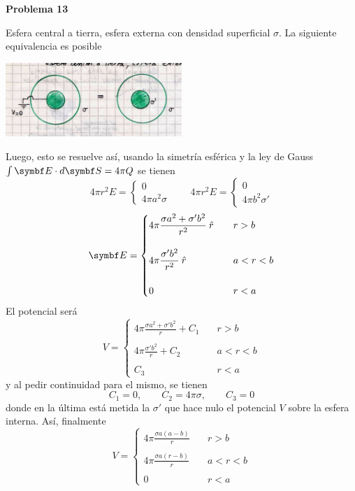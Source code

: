 \documentclass[10pt,oneside]{CBFT_book}
\begin{document}
\begin{ejemplo}{\bf Problema 13}

Esfera central a tierra, esfera externa con densidad superficial $\sigma$.
La siguiente equivalencia es posible

\includegraphics[width=0.5\textwidth]{images/fig_ft1_problema_13a.jpg}

Luego, esto se resuelve así, usando la simetría esférica y la ley de Gauss $ \int \vb{E}\cdot d\vb{S} = 4 \pi Q$
se tienen
\[
	4 \pi r^2 E = \begin{cases} 
	               0 \\
	               4 \pi a^2 \sigma
	              \end{cases}
	\qquad 
	4 \pi r^2 E = \begin{cases} 
	               0 \\
	               4 \pi b^2 \sigma'
	              \end{cases} 
\]
\[
	\vb{E} = \begin{cases}
	          \displaystyle 4 \pi \frac{\sigma a^2 + \sigma' b^2 }{r^2} \rver \quad & r > b \\ 
	          \\
	          \displaystyle 4 \pi \frac{\sigma' b^2}{r^2} \rver \quad & a < r < b \\
	          \\
	          0 & r < a 
	         \end{cases}
\]
El potencial será
\[
	V = \begin{cases}
	          \displaystyle 4 \pi \frac{\sigma a^2 + \sigma' b^2 }{r} + C_1 \quad & r > b \\ 
	          \\
	          \displaystyle 4 \pi \frac{\sigma' b^2}{r}  + C_2 \quad & a < r < b \\
	          \\
	          C_3 & r < a 
	         \end{cases}
\]
y al pedir continuidad para el mismo, se tienen 
\[
	C_1 = 0, \qquad C_2 = 4 \pi \sigma, \qquad C_3 = 0 
\]
donde en la última está metida la $\sigma'$ que hace nulo el potencial $V$ sobre la esfera
interna. Así, finalmente
\[
	V = \begin{cases}
	          \displaystyle 4 \pi \frac{\sigma a (a-b)}{r} \quad & r > b \\ 
	          \\
	          \displaystyle 4 \pi \frac{\sigma a (r-b)}{r} \quad & a < r < b \\
	          \\
	          0 & r < a 
	         \end{cases}
\]


\end{ejemplo}
\end{document}
